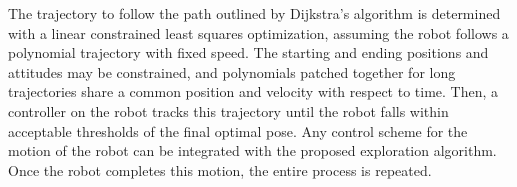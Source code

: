 \documentclass[smallextended]{svjour3}       %
\begin{document}
The trajectory to follow the path outlined by Dijkstra's algorithm is determined with a linear constrained least squares optimization, assuming the robot follows a polynomial trajectory with fixed speed. The starting and ending positions and attitudes may be constrained, and polynomials patched together for long trajectories share a common position and velocity with respect to time. Then, a controller on the robot tracks this trajectory until the robot falls within acceptable thresholds of the final optimal pose. Any control scheme for the motion of the robot can be integrated with the proposed exploration algorithm. Once the robot completes this motion, the entire process is repeated. 



\end{document}
